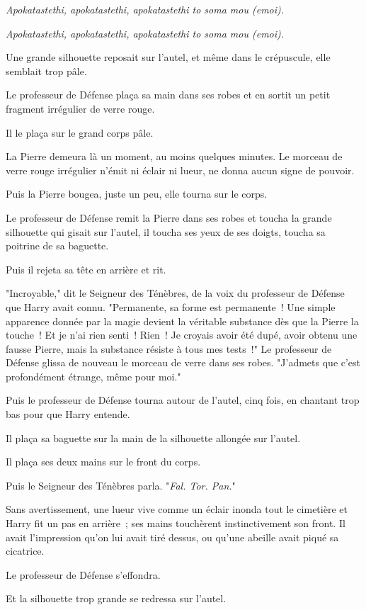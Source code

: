 \emph{Apokatastethi, apokatastethi, apokatastethi to soma mou (emoi).}

\emph{Apokatastethi, apokatastethi, apokatastethi to soma mou (emoi).}

Une grande silhouette reposait sur l'autel, et même dans le crépuscule, elle semblait trop pâle.

Le professeur de Défense plaça sa main dans ses robes et en sortit un petit fragment irrégulier de verre rouge.

Il le plaça sur le grand corps pâle.

La Pierre demeura là un moment, au moins quelques minutes. Le morceau de verre rouge irrégulier n'émit ni éclair ni lueur, ne donna aucun signe de pouvoir.

Puis la Pierre bougea, juste un peu, elle tourna sur le corps.

Le professeur de Défense remit la Pierre dans ses robes et toucha la grande silhouette qui gisait sur l'autel, il toucha ses yeux de ses doigts, toucha sa poitrine de sa baguette.

Puis il rejeta sa tête en arrière et rit.

"Incroyable," dit le Seigneur des Ténèbres, de la voix du professeur de Défense que Harry avait connu. "Permanente, sa forme est permanente~! Une simple apparence donnée par la magie devient la véritable substance dès que la Pierre la touche~! Et je n'ai rien senti~! Rien~! Je croyais avoir été dupé, avoir obtenu une fausse Pierre, mais la substance résiste à tous mes tests~!" Le professeur de Défense glissa de nouveau le morceau de verre dans ses robes. "J'admets que c'est profondément étrange, même pour moi."

Puis le professeur de Défense tourna autour de l'autel, cinq fois, en chantant trop bas pour que Harry entende.

Il plaça sa baguette sur la main de la silhouette allongée sur l'autel.

Il plaça ses deux mains sur le front du corps.

Puis le Seigneur des Ténèbres parla. "\emph{Fal. Tor. Pan.}"

Sans avertissement, une lueur vive comme un éclair inonda tout le cimetière et Harry fit un pas en arrière~; ses mains touchèrent instinctivement son front. Il avait l'impression qu'on lui avait tiré dessus, ou qu'une abeille avait piqué sa cicatrice.

Le professeur de Défense s'effondra.

Et la silhouette trop grande se redressa sur l'autel.

